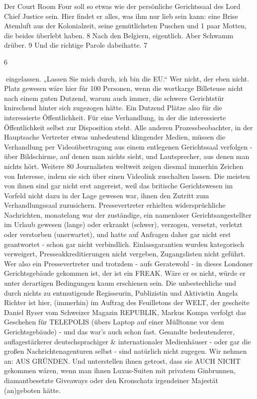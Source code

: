 \begin{multicols}{2}
Der Court Room Four soll so etwas wie der persönliche Gerichtssaal des Lord Chief Justice sein. Hier findet er
alles, was ihm nur lieb sein kann: eine Brise Atemluft aus der Kolonialzeit, seine gemütlichsten Puschen und 1
paar Motten, die beides überlebt haben.
8
Nach den Belgiern, eigentlich. Aber Schwamm drüber.
9
Und die richtige Parole dabeihatte.
7

6

eingelassen. „Lassen Sie mich durch, ich bin die EU.“
Wer nicht, der eben nicht. Platz gewesen wäre hier für
100 Personen, wenn die wortkarge Billeteuse nicht nach
einem guten Dutzend, warum auch immer, die schwere
Gerichtstür knirschend hinter sich zugezogen hätte.
Ein Dutzend Plätze also für die interessierte Öffentlichkeit. Für eine Verhandlung, in der die interessierte Öffentlichkeit selbst zur Disposition steht.
Alle anderen Prozessbeobachter, in der Hauptsache Vertreter etwas unbedeutend klingender Medien, müssen
die Verhandlung per Videoübertragung aus einem entlegenen Gerichtssaal verfolgen - über Bildschirme, auf
denen man nichts sieht, und Lautsprecher, aus denen
man nichts hört. Weitere 80 Journalisten weltweit zeigen
diesmal immerhin Zeichen von Interesse, indem sie sich
über einen Videolink zuschalten lassen.
Die meisten von ihnen sind gar nicht erst angereist, weil
das britische Gerichtswesen im Vorfeld nicht dazu in der
Lage gewesen war, ihnen den Zutritt zum Verhandlungssaal zuzusichern. Pressevertreter erhielten widersprüchliche Nachrichten, monatelang war der zuständige, ein
namenloser Gerichtsangestellter im Urlaub gewesen
(lange) oder erkrankt (schwer), verzogen, versetzt, verletzt oder verstorben (unerwartet), und hatte auf Anfragen daher gar nicht erst geantwortet - schon gar nicht
verbindlich. Einlassgarantien wurden kategorisch verweigert, Presseakkreditierungen nicht vergeben, Zugangslisten nicht geführt.
Wer also ein Pressevertreter und trotzdem - aufs Geratewohl - in dieses Londoner Gerichtsgebäude gekommen
ist, der ist ein FREAK. Wäre er es nicht, würde er unter
derartigen Bedingungen kaum erschienen sein. Die unbestechliche und durch nichts zu entmutigende Regisseurin, Publizistin und Aktivistin Angela Richter ist hier,
(immerhin) im Auftrag des Feuilletons der WELT, der
gescheite Daniel Ryser vom Schweizer Magazin REPUBLIK, Markus Kompa verfolgt das Geschehen für TELEPOLIS (übers Laptop auf einer Mülltonne vor dem Gerichtsgebäude) - und das war’s auch schon fast.
Gesandte bedeutenderer, auflagestärkerer deutschsprachiger \& internationaler Medienhäuser - oder gar
die großen Nachrichtenagenturen selbst - sind natürlich nicht zugegen. Wir nehmen an: AUS GRÜNDEN.
Und unterstellen ihnen getrost, dass sie AUCH NICHT
gekommen wären, wenn man ihnen Luxus-Suiten mit
privatem Ginbrunnen, diamantbesetzte Giveaways oder
den Kronschatz irgendeiner Majestät (an)geboten hätte.


\end{multicols}
